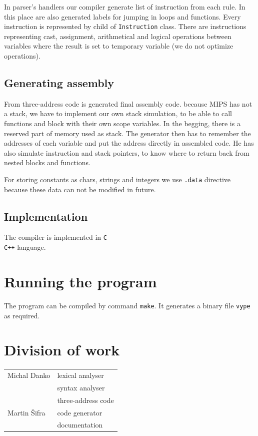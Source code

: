 \documentclass[a4paper, 11pt, titlepage, final]{article}
\begin{document}
In parser's handlers our compiler generate list of instruction from each rule. In this place are also generated labels for jumping in loops and functions. Every instruction is represented by child of \texttt{Instruction} class. There are instructions representing cast, assignment, arithmetical  and logical operations between variables where the result is set to temporary variable (we do not optimize operations). 

\subsection{Generating assembly}

From three-address code is generated final assembly code. because MIPS has not a stack, we have to implement our own stack simulation, to be able to call functions and block with their own scope variables. In the begging, there is a reserved part of memory used as stack. The generator then has to remember the addresses of each variable and put the address directly in assembled code. He has also simulate instruction and stack pointers, to know where to return back from nested blocks and functions.   

For storing constants as chars, strings and integers we use \texttt{.data} directive because these data can not be modified in future.

\subsection{Implementation}

The compiler is implemented in \texttt{C\\C++} language.

\section{Running the program}

The program can be compiled by command \texttt{make}. It generates a binary file \texttt{vype} as required.


\section{Division of work}

\begin{tabular}{ll}\\
Michal Danko & lexical analyser \\
                & syntax analyser \\
                & three-address code \medskip \\
Martin \v{S}ifra    & code generator\\
                & documentation \\
\end{tabular}
\par
\end{document}
